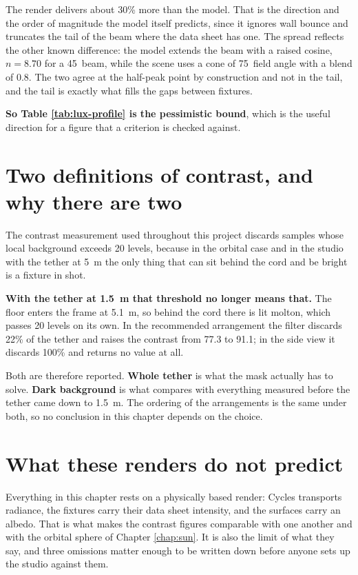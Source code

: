 The render delivers about 30\% more than the model. That is the direction and
the order of magnitude the model itself predicts, since it ignores wall
bounce and truncates the tail of the beam where the data sheet has one. The
spread reflects the other known difference: the model extends the beam with a
raised cosine, $n = 8.70$ for a 45\textdegree\ beam, while the scene uses a
cone of 75\textdegree\ field angle with a blend of 0.8. The two agree at the
half-peak point by construction and not in the tail, and the tail is exactly
what fills the gaps between fixtures.

\textbf{So Table \ref{tab:lux-profile} is the pessimistic bound}, which is
the useful direction for a figure that a criterion is checked against.

\section{Two definitions of contrast, and why there are two}
\label{sec:sim-contrast}

The contrast measurement used throughout this project discards samples whose
local background exceeds 20 levels, because in the orbital case and in the
studio with the tether at 5~m the only thing that can sit behind the cord and
be bright is a fixture in shot.

\textbf{With the tether at 1.5~m that threshold no longer means that.} The
floor enters the frame at 5.1~m, so behind the cord there is lit molton,
which passes 20 levels on its own. In the recommended arrangement the filter
discards 22\% of the tether and raises the contrast from 77.3 to 91.1; in the
side view it discards 100\% and returns no value at all.

Both are therefore reported. \textbf{Whole tether} is what the mask actually
has to solve. \textbf{Dark background} is what compares with everything
measured before the tether came down to 1.5~m. The ordering of the
arrangements is the same under both, so no conclusion in this chapter depends
on the choice.

\section{What these renders do not predict}
\label{sec:sim-notpredicted}

Everything in this chapter rests on a physically based render: Cycles
transports radiance, the fixtures carry their data sheet intensity, and the
surfaces carry an albedo. That is what makes the contrast figures comparable
with one another and with the orbital sphere of Chapter \ref{chap:sun}. It is
also the limit of what they say, and three omissions matter enough to be
written down before anyone sets up the studio against them.

